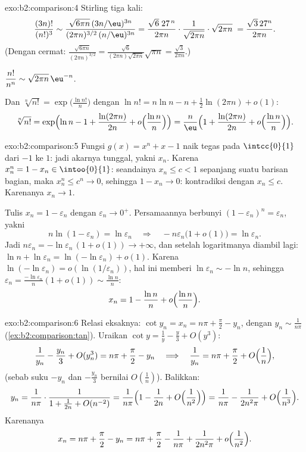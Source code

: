 \begin{solution}{exo:b2:comparison:4}
Stirling tiga kali:
\[
\frac{(3n)!}{(n!)^3}
\sim \frac{\sqrt{6\pi n}\,(3n/\eu)^{3n}}
{(2\pi n)^{3/2}\,(n/\eu)^{3n}}
= \frac{\sqrt{6}\; 27^{\,n}}{2\pi n} \cdot
\frac{1}{\sqrt{2\pi n}}\cdot\sqrt{2\pi n}\;
= \frac{\sqrt3\,27^n}{2\pi n} .
\]
(Dengan cermat: $\frac{\sqrt{6\pi n}}{(2\pi n)^{3/2}} =
\frac{\sqrt6}{(2\pi n)\sqrt{2\pi n}}\sqrt{\pi n} =
\frac{\sqrt3}{2\pi n}$.)

$\dfrac{n!}{n^n} \sim \sqrt{2\pi n}\,\eu^{-n}$.

Dan $\sqrt[n]{n!} = \exp\bigl(\frac{\ln n!}{n}\bigr)$ dengan $\ln n! =
n\ln n - n + \frac12\ln(2\pi n) + o(1)$:
\[
\sqrt[n]{n!} = \exp\Bigl(\ln n - 1 + \frac{\ln(2\pi n)}{2n} +
o\Bigl(\frac{\ln n}{n}\Bigr)\Bigr)
= \frac{n}{\eu}\Bigl(1 + \frac{\ln(2\pi n)}{2n} +
o\Bigl(\frac{\ln n}{n}\Bigr)\Bigr).
\]
\end{solution}

\begin{solution}{exo:b2:comparison:5}
Fungsi $g(x) = x^n + x - 1$ naik tegas pada $\intcc{0}{1}$ dari $-1$
ke $1$: jadi akarnya tunggal, yakni $x_n$. Karena $x_n^n = 1 - x_n \in
\intoo{0}{1}$: seandainya $x_n \leq c < 1$ sepanjang suatu barisan
bagian, maka $x_n^n \leq c^n \to 0$, sehingga $1 - x_n \to 0$:
kontradiksi dengan $x_n \leq c$. Karenanya $x_n \to 1$.

Tulis $x_n = 1 - \varepsilon_n$ dengan $\varepsilon_n \to 0^+$.
Persamaannya berbunyi $(1 - \varepsilon_n)^n = \varepsilon_n$, yakni
\[
n\ln(1 - \varepsilon_n) = \ln \varepsilon_n
\quad\Longrightarrow\quad
-n\varepsilon_n\bigl(1 + o(1)\bigr) = \ln\varepsilon_n .
\]
Jadi $n\varepsilon_n = -\ln\varepsilon_n\,(1 + o(1)) \to +\infty$, dan
setelah logaritmanya diambil lagi: $\ln n + \ln\varepsilon_n =
\ln(-\ln\varepsilon_n) + o(1)$. Karena $\ln(-\ln \varepsilon_n) =
o(\ln(1/\varepsilon_n))$, hal ini memberi $\ln\varepsilon_n \sim -\ln
n$, sehingga $\varepsilon_n = \frac{-\ln\varepsilon_n}{n}(1 + o(1))
\sim \frac{\ln n}{n}$:
\[
x_n = 1 - \frac{\ln n}{n} + o\Bigl(\frac{\ln n}{n}\Bigr) .
\]
\end{solution}

\begin{solution}{exo:b2:comparison:6}
Relasi eksaknya: $\cot y_n = x_n = n\pi + \frac\pi2 - y_n$, dengan $y_n
\sim \frac{1}{n\pi}$ (\cref{ex:b2:comparison:tan}). Uraikan $\cot y
= \frac1y - \frac y3 + O(y^3)$:
\[
\frac{1}{y_n} - \frac{y_n}{3} + O(y_n^3) = n\pi + \frac\pi2 - y_n
\quad\Longrightarrow\quad
\frac{1}{y_n} = n\pi + \frac\pi2 + O\Bigl(\frac1n\Bigr),
\]
(sebab suku $-y_n$ dan $-\frac{y_n}{3}$ bernilai $O(\frac1n)$). Balikkan:
\[
y_n = \frac{1}{n\pi}\cdot\frac{1}{1 + \frac{1}{2n} + O(n^{-2})}
= \frac{1}{n\pi}\Bigl(1 - \frac{1}{2n} + O\Bigl(\frac{1}{n^2}\Bigr)\Bigr)
= \frac{1}{n\pi} - \frac{1}{2n^2\pi} + O\Bigl(\frac{1}{n^3}\Bigr).
\]
Karenanya
\[
x_n = n\pi + \frac{\pi}{2} - y_n
= n\pi + \frac\pi2 - \frac{1}{n\pi} + \frac{1}{2n^2\pi} +
o\Bigl(\frac{1}{n^2}\Bigr).
\]
\end{solution}

